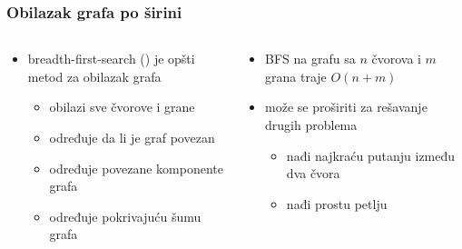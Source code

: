 \documentclass[compress]{beamer}
\begin{document}
\begin{frame}[fragile]
  \frametitle{Obilazak grafa po širini}
  \begin{columns}
    \begin{column}[t]{6cm}
      \begin{itemize}
        \item breadth-first-search () je opšti metod za 
        obilazak grafa
        \begin{itemize}
          \item obilazi sve čvorove i grane
          \item određuje da li je graf povezan
          \item određuje povezane komponente grafa
          \item određuje pokrivajuću šumu grafa
        \end{itemize}
      \end{itemize}
    \end{column}
    \begin{column}[t]{6cm}
      \begin{itemize}
        \item BFS na grafu sa $n$ čvorova i $m$ grana traje $O(n+m)$
        \item može se proširiti za rešavanje drugih problema
        \begin{itemize}
          \item nađi najkraću putanju između dva čvora
          \item nađi prostu petlju
        \end{itemize}
      \end{itemize}
    \end{column}
  \end{columns}
\end{frame}
\end{document}
